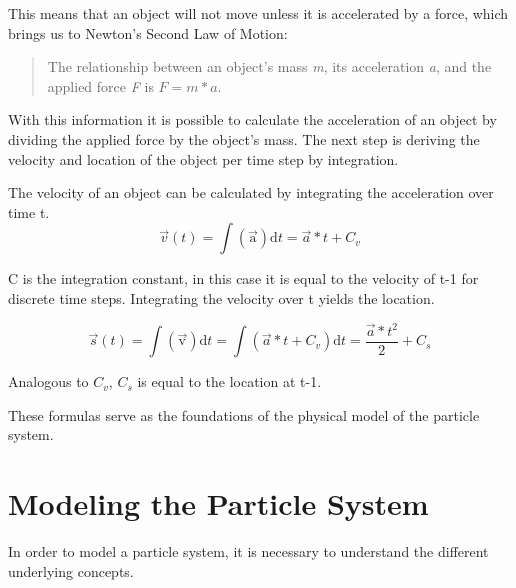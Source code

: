 \documentclass[runningheads,a4paper]{llncs}
\begin{document}
This means that an object will not move unless it is accelerated by a force, which brings us to Newton's Second Law of Motion:
\begin{quotation}
The relationship between an object's mass \emph{m}, its acceleration \emph{a}, and the applied force \emph{F} is $ F = m*a $.
\end{quotation}

With this information it is possible to calculate the acceleration of an object by dividing the applied force by the object's mass. The next step is deriving the velocity and location of the object per time step by integration.

The velocity of an object can be calculated by integrating the acceleration over time t. 
\begin{equation}
\overrightarrow{v}(t) = \int \mathrm{(\overrightarrow{a})} \mathrm{d}t = \overrightarrow{a}*t + C_v
\label{eq:vel}
\end{equation}

C is the integration constant, in this case it is equal to the velocity of t-1 for discrete time steps. Integrating the velocity over t yields the location.

\begin{equation}
\overrightarrow{s}(t) = \int \mathrm{(\overrightarrow{v})} \mathrm{d}t = \int (\overrightarrow{a}*t + C_v) \mathrm{d}t = \frac{\overrightarrow{a}*t^2}{2} + C_s
\label{eq:loc}
\end{equation}

Analogous to $C_v$, $C_s$ is equal to the location at t-1.

These formulas serve as the foundations of the physical model of the particle system. 

\section{Modeling the Particle System}
In order to model a particle system, it is necessary to understand the different underlying concepts.

\end{document}

